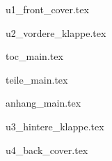 \documentclass{skript}
\begin{document}

{u1_front_cover.tex}

{u2_vordere_klappe.tex}

{toc_main.tex}

{teile_main.tex}

{anhang_main.tex}

{u3_hintere_klappe.tex}

{u4_back_cover.tex}
	
\end{document}
